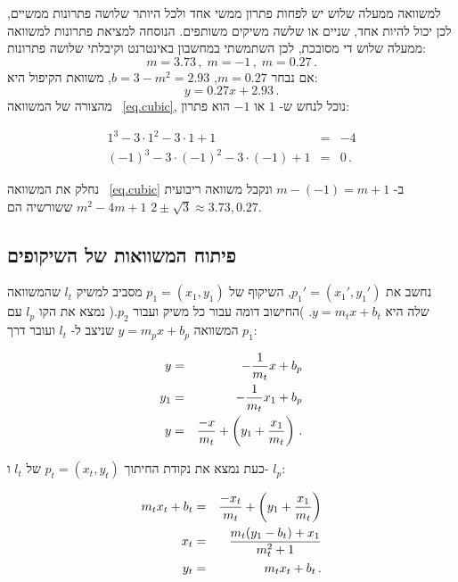 למשוואה ממעלה שלוש יש לפחות פתרון ממשי אחד ולכל היותר שלושה פתרונות ממשיים, לכן יכול להיות אחד, שניים או שלשה משיקים משותפים. הנוסחה למציאת פתרונות למשוואה ממעלה שלוש די מסובכת, לכן השתמשתי במחשבון באינטרנט וקיבלתי שלושה פתרונות:
\[
m=3.73\,, \;m=-1\,, \; m=0.27\,.
\]
אם נבחר
$m=0.27$, $b=3-m^2=2.93$,
משוואת הקיפול היא:
\[
y=0.27x+2.93\,.
\]
מהצורה של המשוואה%
~\ref{eq.cubic},
נוכל לנחש ש-%
$1$
או
$-1$
הוא פתרון:

\begin{eqnarray*}
1^3-3\cdot 1^2-3\cdot 1+1&=&-4\\
(-1)^3-3\cdot (-1)^2-3\cdot(-1)+1&=&0\,.
\end{eqnarray*}


נחלק את המשוואה%
~\ref{eq.cubic}
ב-%
$m-(-1)=m+1$
ונקבל משוואה ריבועית
$m^2-4m+1$
ששורשיה הם
$2\pm\sqrt{3}\approx 3.73, 0.27$.




\subsection{פיתוח המשוואות של השיקופים}

נחשב את  
$p_1'=(x_1',y_1')$,
השיקוף של
$p_1=(x_1,y_1)$
מסביב למשיק
$l_t$
שהמשוואה שלה היא
$y=m_tx+b_t$.
)החישוב דומה עבור כל משיק ועבור
$p_2$.(
נמצא את הקו
$l_p$
עם המשוואה
$y=m_px+b_p$
שניצב ל-%
$l_t$
ועובר דרך
$p_1$:

\begin{eqnarray*}
y&=&-\displaystyle\frac{1}{m_t}x+b_p\\
y_1&=&-\displaystyle\frac{1}{m_t}x_1+b_p\\
y&=&\displaystyle\frac{-x}{m_t}+\left(y_1+\displaystyle\frac{x_1}{m_t}\right)\,.
\end{eqnarray*}



כעת נמצא את נקודת החיתוך 
$p_t=(x_t,y_t)$
של
$l_t$
ו-%
$l_p$:




\begin{eqnarray*}
m_tx_t+b_t&=&\displaystyle\frac{-x_t}{m_t}+\left(y_1+\displaystyle\frac{x_1}{m_t}\right)\\
x_t&=& \displaystyle\frac{m_t(y_1-b_t)+x_1}{m_t^2+1}\\
y_t&=&m_tx_t+b_t\,.
\end{eqnarray*}




